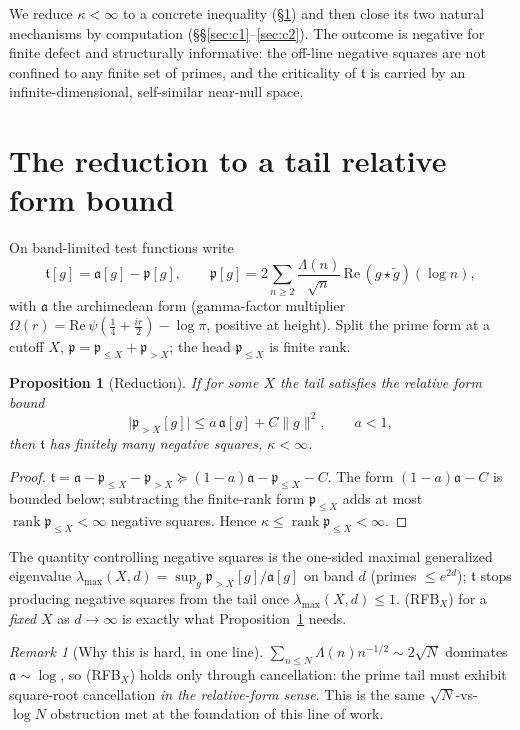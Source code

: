 \documentclass[11pt]{amsart}
\newtheorem{proposition}[theorem]{Proposition}
\theoremstyle{definition}
\theoremstyle{remark}
\newtheorem{remark}[theorem]{Remark}
\newcommand{\fa}{\mathfrak a}
\newcommand{\fp}{\mathfrak p}
\newcommand{\ft}{\mathfrak t}
\begin{document}
We reduce $\kappa<\infty$ to a concrete inequality (\S\ref{sec:red}) and then
close its two natural mechanisms by computation (\S\S\ref{sec:c1}--\ref{sec:c2}).
The outcome is negative for finite defect and structurally informative: the
off-line negative squares are not confined to any finite set of primes, and the
criticality of $\ft$ is carried by an infinite-dimensional, self-similar
near-null space.

\section{The reduction to a tail relative form bound}\label{sec:red}
On band-limited test functions write
\[
\ft[g]=\fa[g]-\fp[g],\qquad
\fp[g]=2\sum_{n\ge2}\frac{\Lambda(n)}{\sqrt n}\,\mathrm{Re}\,(g\star\tilde g)(\log n),
\]
with $\fa$ the archimedean form (gamma-factor multiplier
$\Omega(r)=\mathrm{Re}\,\psi(\tfrac14+\tfrac{ir}{2})-\log\pi$, positive at
height). Split the prime form at a cutoff $X$, $\fp=\fp_{\le X}+\fp_{>X}$; the
head $\fp_{\le X}$ is finite rank.

\begin{proposition}[Reduction]\label{prop:red}
If for some $X$ the tail satisfies the relative form bound
\begin{equation}\tag{RFB$_X$}
\bigl|\fp_{>X}[g]\bigr|\le a\,\fa[g]+C\|g\|^2,\qquad a<1,
\end{equation}
then $\ft$ has finitely many negative squares, $\kappa<\infty$.
\end{proposition}
\begin{proof}
$\ft=\fa-\fp_{\le X}-\fp_{>X}\succeq(1-a)\fa-\fp_{\le X}-C$. The form
$(1-a)\fa-C$ is bounded below; subtracting the finite-rank form $\fp_{\le X}$
adds at most $\operatorname{rank}\fp_{\le X}<\infty$ negative squares. Hence
$\kappa\le\operatorname{rank}\fp_{\le X}<\infty$.
\end{proof}

The quantity controlling negative squares is the one-sided maximal generalized
eigenvalue
$\lambda_{\max}(X,d)=\sup_g \fp_{>X}[g]/\fa[g]$ on band $d$ (primes $\le e^{2d}$);
$\ft$ stops producing negative squares from the tail once
$\lambda_{\max}(X,d)\le1$. (RFB$_X$) for a \emph{fixed} $X$ as $d\to\infty$ is
exactly what Proposition~\ref{prop:red} needs.

\begin{remark}[Why this is hard, in one line]
$\sum_{n\le N}\Lambda(n)n^{-1/2}\sim2\sqrt N$ dominates $\fa\sim\log$, so
(RFB$_X$) holds only through cancellation: the prime tail must exhibit
square-root cancellation \emph{in the relative-form sense}. This is the same
$\sqrt N$-vs-$\log N$ obstruction met at the foundation of this line of work.
\end{remark}
\end{document}
